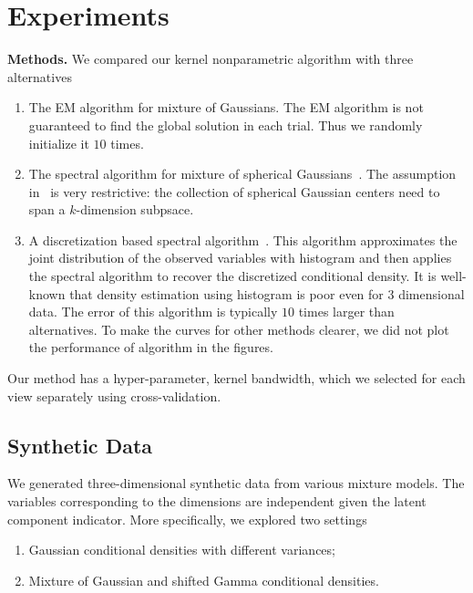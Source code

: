 \documentclass{article}
\begin{document}
\section{Experiments}

{\bf Methods.} We compared our kernel nonparametric algorithm with three alternatives
\begin{enumerate}
  \item The EM algorithm for mixture of Gaussians. The EM algorithm is not guaranteed to find the global solution in each trial. Thus we randomly initialize it $10$ times.
  \item The spectral algorithm for mixture of spherical Gaussians~\citep{Hsu13}. The assumption in~\citet{Hsu13} is very restrictive: the collection of spherical Gaussian centers need to span a $k$-dimension subpsace.
  \item A discretization based spectral algorithm~\citep{Hiroyuki10}. This algorithm approximates the joint distribution of the observed variables with histogram and then applies the spectral algorithm to recover the discretized conditional density. It is well-known that density estimation using histogram is poor even for 3 dimensional data. The error of this algorithm is typically $10$ times larger than alternatives. To make the curves for other methods clearer, we did not plot the performance of \citet{Hiroyuki10} algorithm in the figures.
\end{enumerate}
Our method has a hyper-parameter, kernel bandwidth, which we selected for each view separately using cross-validation.

\subsection{Synthetic Data}

We generated three-dimensional synthetic data from various mixture models. The variables corresponding to the dimensions are independent given the latent component indicator. More specifically, we explored two settings
\begin{enumerate}
  \item Gaussian conditional densities with different variances;
  \item Mixture of Gaussian and shifted Gamma conditional densities.
\end{enumerate}
\end{document}
